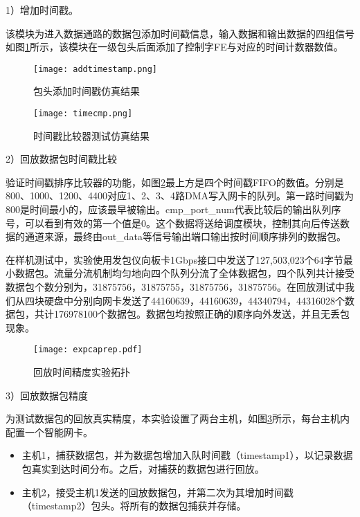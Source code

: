 1）增加时间戳。

该模块为进入数据通路的数据包添加时间戳信息，输入数据和输出数据的四组信号如图\ref{fig:addtimestamp}所示，该模块在一级包头后面添加了控制字FE与对应的时间计数器数值。

\begin{figure}[!ht]
	\centering 
	\texttt{[image: addtimestamp.png]}
	\caption{包头添加时间戳仿真结果} \label{fig:addtimestamp}
\end{figure}

\begin{figure}[!ht]
	\centering 
	\texttt{[image: timecmp.png]}
	\caption{时间戳比较器测试仿真结果} \label{fig:timecmp}
\end{figure}

2）回放数据包时间戳比较

验证时间戳排序比较器的功能，如图\ref{fig:timecmp}最上方是四个时间戳FIFO的数值。分别是800、1000、1200、4400对应1、2、3、4路DMA写入网卡的队列。第一路时间戳为800是时间最小的，应该最早被输出。cmp\_port\_num代表比较后的输出队列序号，可以看到有效的第一个值是0。这个数据将送给调度模块，控制其向后传送数据的通道来源，最终由out\_data等信号输出端口输出按时间顺序排列的数据包。

在样机测试中，实验使用发包仪向板卡1Gbps接口中发送了127,503,023个64字节最小数据包。流量分流机制均匀地向四个队列分流了全体数据包，四个队列共计接受数据包个数分别为，31875756，31875755，31875756，31875756。在回放测试中我们从四块硬盘中分别向网卡发送了44160639，44160639，44340794，44316028个数据包，共计176978100个数据包。数据包均按照正确的顺序向外发送，并且无丢包现象。

\begin{figure}[!ht]
	\centering 
	\texttt{[image: expcaprep.pdf]}
	\caption{回放时间精度实验拓扑} \label{fig:expcaprep}
\end{figure}

3）回放数据包精度

为测试数据包的回放真实精度，本实验设置了两台主机，如图\ref{fig:expcaprep}所示，每台主机内配置一个智能网卡。

\begin{itemize}
	\item 主机1，捕获数据包，并为数据包增加入队时间戳（timestamp1），以记录数据包真实到达时间分布。之后，对捕获的数据包进行回放。
	\item 主机2，接受主机1发送的回放数据包，并第二次为其增加时间戳（timestamp2）包头。将所有的数据包捕获并存储。
\end{itemize}

